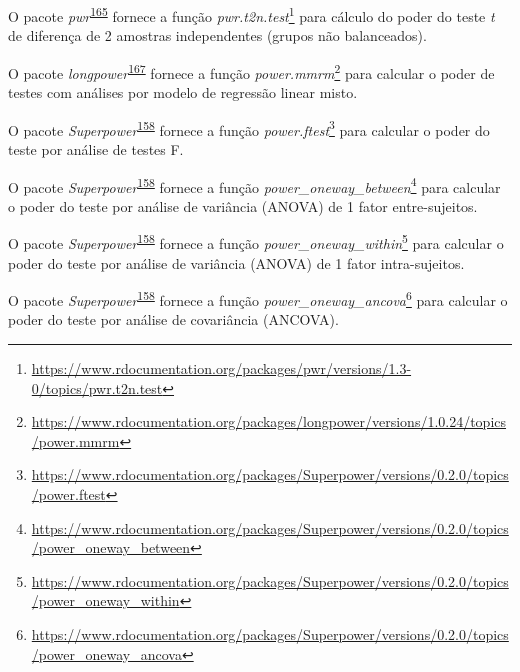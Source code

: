 \documentclass[
  a4paper,
]{book}
\renewcommand{\href}[2]{#2\footnote{\url{#1}}}
\newenvironment{infobox}[1]
  {
  \begin{itemize}
  \renewcommand{\labelitemi}{
    \raisebox{-.7\height}[0pt][0pt]{
      {\setkeys{Gin}{width=3em,keepaspectratio}
        \texttt{[image: \#1]}}
    }
  }
  \setlength{\fboxsep}{1em}
  \begin{blackbox}
  \item
  }
  {
  \end{blackbox}
  \end{itemize}
  }
\begin{document}
\begin{infobox}{images/Rlogo}
O pacote \emph{pwr}\textsuperscript{\protect\hyperlink{ref-pwr}{165}} fornece a função \href{https://www.rdocumentation.org/packages/pwr/versions/1.3-0/topics/pwr.t2n.test}{\emph{pwr.t2n.test}} para cálculo do poder do teste \emph{t} de diferença de 2 amostras independentes (grupos não balanceados).

\end{infobox}

\begin{infobox}{images/Rlogo}
O pacote \emph{longpower}\textsuperscript{\protect\hyperlink{ref-longpower}{167}} fornece a função \href{https://www.rdocumentation.org/packages/longpower/versions/1.0.24/topics/power.mmrm}{\emph{power.mmrm}} para calcular o poder de testes com análises por modelo de regressão linear misto.

\end{infobox}

\begin{infobox}{images/Rlogo}
O pacote \emph{Superpower}\textsuperscript{\protect\hyperlink{ref-Superpower}{158}} fornece a função \href{https://www.rdocumentation.org/packages/Superpower/versions/0.2.0/topics/power.ftest}{\emph{power.ftest}} para calcular o poder do teste por análise de testes F.

\end{infobox}

\begin{infobox}{images/Rlogo}
O pacote \emph{Superpower}\textsuperscript{\protect\hyperlink{ref-Superpower}{158}} fornece a função \href{https://www.rdocumentation.org/packages/Superpower/versions/0.2.0/topics/power_oneway_between}{\emph{power\_oneway\_between}} para calcular o poder do teste por análise de variância (ANOVA) de 1 fator entre-sujeitos.

\end{infobox}

\begin{infobox}{images/Rlogo}
O pacote \emph{Superpower}\textsuperscript{\protect\hyperlink{ref-Superpower}{158}} fornece a função \href{https://www.rdocumentation.org/packages/Superpower/versions/0.2.0/topics/power_oneway_within}{\emph{power\_oneway\_within}} para calcular o poder do teste por análise de variância (ANOVA) de 1 fator intra-sujeitos.

\end{infobox}

\begin{infobox}{images/Rlogo}
O pacote \emph{Superpower}\textsuperscript{\protect\hyperlink{ref-Superpower}{158}} fornece a função \href{https://www.rdocumentation.org/packages/Superpower/versions/0.2.0/topics/power_oneway_ancova}{\emph{power\_oneway\_ancova}} para calcular o poder do teste por análise de covariância (ANCOVA).

\end{infobox}
\end{document}
